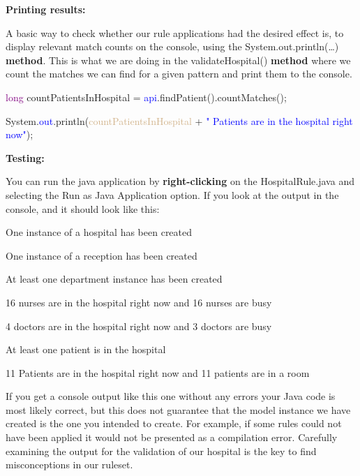 \textbf{Printing results:}

A basic way to check whether our rule applications had the desired effect is, to display relevant match counts on the console, using the \textsf{System.out.println(…)} \textbf{method}. This is what we are doing in the \textsf{validateHospital()} \textbf{method} where we count the matches we can find for a given pattern and print them to the console.\newline

{

\textcolor{Purple}{long} countPatientsInHospital = \textcolor{blue}{api}.findPatient().countMatches();

System.\textcolor{blue}{out}.println(\textcolor{Tan}{countPatientsInHospital} + \textcolor{blue}{" Patients are in the hospital right now"});\newline\newline

}

\clearpage

\textbf{Testing:}

You can run the java application by \textbf{right-clicking} on the \textsf{HospitalRule.java} and selecting the \textsf{Run as Java Application} option. If you look at the output in the console, and it should look like this:\newline

{
\textsf{One instance of a hospital has been created}

\textsf{One instance of a reception has been created}

\textsf{At least one department instance has been created}

\textsf{16 nurses are in the hospital right now and 16 nurses are busy}

\textsf{4 doctors are in the hospital right now and 3 doctors are busy}

\textsf{At least one patient is in the hospital}

\textsf{11 Patients are in the hospital right now and 11 patients are in a room}\newline

}

If you get a console output like this one without any errors your Java code is most likely correct, but this does not guarantee that the model instance we have created is the one you intended to create.\newline
For example, if some rules could not have been applied it would not be presented as a compilation error. Carefully examining the output for the validation of our hospital is the key to find misconceptions in our ruleset.

